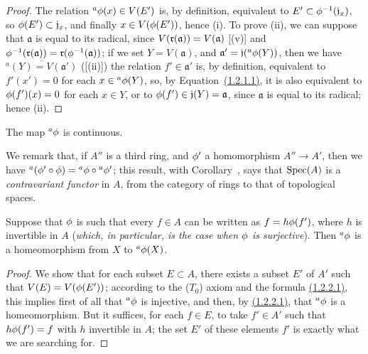 \begin{proof}
The relation ${}^a\phi(x)\in V(E')$ is, by definition, equivalent to $E'\subset\phi^{-1}(\mathfrak{j}_x)$, so $\phi(E')\subset\mathfrak{j}_x$, and finally $x\in V(\phi(E'))$, hence (i).
To prove (ii), we can suppose that $\mathfrak{a}$ is equal to its radical, since $V(\mathfrak{r}(\mathfrak{a}))=V(\mathfrak{a})$ [(v)] and $\phi^{-1}(\mathfrak{r}(\mathfrak{a}))=\mathfrak{r}(\phi^{-1}(\mathfrak{a}))$;
if we set $Y=V(\mathfrak{a})$, and $\mathfrak{a}'=\mathfrak{j}({}^a\phi(Y))$, then we have $\overline{{}^a(Y)=V(\mathfrak{a}')}$ ([(ii)])
the relation $f'\in\mathfrak{a}'$ is, by definition, equivalent to $f'(x')=0$ for each $x\in{{}^a\phi(Y)}$, so, by Equation~\hyperref[I.1.2.1]{(1.2.1.1)}, it is also equivalent to $\phi(f')(x)=0$ for each $x\in Y$, or to $\phi(f')\in\mathfrak{j}(Y)=\mathfrak{a}$, since $\mathfrak{a}$ is equal to its radical;
hence (ii).
\end{proof}

\begin{corollary}[1.2.3]
\label{I.1.2.3}
The map ${}^a\phi$ is continuous.
\end{corollary}

We remark that, if $A''$ is a third ring, and $\phi'$ a homomorphism $A''\to A'$, then we have ${}^a(\phi'\circ\phi)={}^a\phi\circ{}^a\phi'$;
this result, with Corollary~, says that $\operatorname{Spec}(A)$ is a \emph{contravariant functor} in $A$, from the category of rings to that of topological spaces.

\begin{corollary}[1.2.4]
\label{I.1.2.4}
Suppose that $\phi$ is such that every $f\in A$ can be written as $f=h\phi(f')$, where $h$ is invertible in $A$ (\emph{which, in particular, is the case when $\phi$ is \emph{surjective}}).
Then ${}^a\phi$ is a homeomorphism from $X$ to ${}^a\phi(X)$.
\end{corollary}

\begin{proof}
We show that for each subset $E\subset A$, there exists a subset $E'$ of $A'$ such that $V(E)=V(\phi(E'))$;
according to the ($T_0$) axiom  and the formula \hyperref[I.1.2.2]{(1.2.2.1)}, this implies first of all that ${}^a\phi$ is injective, and then, by \hyperref[I.1.2.2]{(1.2.2.1)}, that ${}^a\phi$ is a homeomorphism.
But it suffices, for each $f\in E$, to take $f'\in A'$ such that $h\phi(f')=f$ with $h$ invertible in $A$;
the set $E'$ of these elements $f'$ is exactly what we are searching for.
\end{proof}

